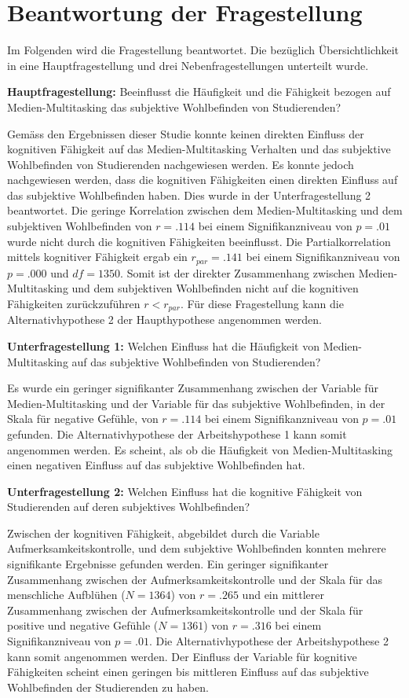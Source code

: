 \section{Beantwortung der Fragestellung}\label{section.diskussion.fragestellung}
Im Folgenden wird die Fragestellung beantwortet. Die bezüglich Übersichtlichkeit in eine Hauptfragestellung und drei Nebenfragestellungen unterteilt wurde. 
\par
\textbf{Hauptfragestellung:} Beeinflusst die Häufigkeit und die Fähigkeit bezogen auf Medien-Multitasking das subjektive Wohlbefinden von Studierenden?
\par
Gemäss den Ergebnissen dieser Studie konnte keinen direkten Einfluss der kognitiven Fähigkeit auf das Medien-Multitasking Verhalten und das subjektive Wohlbefinden von Studierenden nachgewiesen werden. Es konnte jedoch nachgewiesen werden, dass die kognitiven Fähigkeiten einen direkten Einfluss auf das subjektive Wohlbefinden haben. Dies wurde in der Unterfragestellung 2 beantwortet. Die geringe Korrelation zwischen dem Medien-Multitasking und dem subjektiven Wohlbefinden von $r=.114$ bei einem Signifikanzniveau von $p=.01$ wurde nicht durch die kognitiven Fähigkeiten beeinflusst. Die Partialkorrelation mittels kognitiver Fähigkeit ergab ein $r_{par}=.141$ bei einem Signifikanzniveau von $p=.000$ und $df=1350$. Somit ist der direkter Zusammenhang zwischen Medien-Multitasking und dem subjektiven Wohlbefinden nicht auf die kognitiven Fähigkeiten zurückzuführen $r<r_{par}$. Für diese Fragestellung kann die Alternativhypothese 2 der Haupthypothese angenommen werden.
\par
\textbf{Unterfragestellung 1:} Welchen Einfluss hat die Häufigkeit von Medien-Multitasking auf das subjektive Wohlbefinden von Studierenden?
\par
Es wurde ein geringer signifikanter Zusammenhang zwischen der Variable für Medien-Multitasking und der Variable für das subjektive Wohlbefinden, in der Skala für negative Gefühle, von $r=.114$ bei einem Signifikanzniveau von $p=.01$ gefunden. Die Alternativhypothese der Arbeitshypothese 1 kann somit angenommen werden. Es scheint, als ob die Häufigkeit von Medien-Multitasking einen negativen Einfluss auf das subjektive Wohlbefinden hat. 
\par
\textbf{Unterfragestellung 2:} Welchen Einfluss hat die kognitive Fähigkeit von Studierenden auf deren subjektives Wohlbefinden?
\par
Zwischen der kognitiven Fähigkeit, abgebildet durch die Variable Aufmerksamkeitskontrolle, und dem subjektive Wohlbefinden konnten mehrere signifikante Ergebnisse gefunden werden. Ein geringer signifikanter Zusammenhang zwischen der Aufmerksamkeitskontrolle und der Skala für das menschliche Aufblühen ($N=1364$) von $r=.265$ und ein mittlerer Zusammenhang zwischen der Aufmerksamkeitskontrolle und der Skala für positive und negative Gefühle ($N=1361$) von $r=.316$ bei einem Signifikanzniveau von $p=.01$. Die Alternativhypothese der Arbeitshypothese 2 kann somit angenommen werden. Der Einfluss der Variable für kognitive Fähigkeiten scheint einen geringen bis mittleren Einfluss auf das subjektive Wohlbefinden der Studierenden zu haben.
